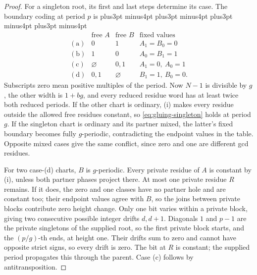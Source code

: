\documentclass[11pt,a4paper]{amsart}
\numberwithin{equation}{section}
\theoremstyle{plain}
\theoremstyle{definition}
\begin{document}
\begin{proof}
For a singleton root, its first and last steps determine its case.  The boundary coding at period \(p\) is
{\abovedisplayskip=14pt plus3pt minus4pt \belowdisplayskip=14pt plus3pt minus4pt
 \abovedisplayshortskip=14pt plus3pt minus4pt \belowdisplayshortskip=14pt plus3pt minus4pt
\begin{equation}\label{eq:gluing-singleton}
 \begin{array}{c|cc|c}
 &\text{free }A&\text{free }B&\text{fixed values}\\ \hline
 \mathrm{(a)}&0&1&A_1=B_0=0\\
 \mathrm{(b)}&1&0&A_0=B_1=1\\
 \mathrm{(c)}&\varnothing&0,1&A_1=0,\ A_0=1\\
 \mathrm{(d)}&0,1&\varnothing&B_1=1,\ B_0=0.
 \end{array}
\end{equation}}
Subscripts zero mean positive multiples of the period.  Now \(N-1\) is divisible by \(g\), the other width is \(1+bg\), and every reduced residue word has at least twice both reduced periods.  If the other chart is ordinary, (i) makes every residue outside the allowed free residues constant, so \eqref{eq:gluing-singleton} holds at period \(g\).  If the singleton chart is ordinary and its partner mixed, the latter's fixed boundary becomes fully \(g\)-periodic, contradicting the endpoint values in the table.  Opposite mixed cases give the same conflict, since zero and one are different gcd residues.

For two case-(d) charts, \(B\) is \(g\)-periodic.  Every private residue of \(A\) is constant by (i), unless both partner phases project there.  At most one private residue \(R\) remains.  If it does, the zero and one classes have no partner hole and are constant too; their endpoint values agree with \(B\), so the joins between private blocks contribute zero height change.  Only one bit varies within a private block, giving two consecutive possible integer drifts \(d,d+1\).  Diagonals \(1\) and \(p-1\) are the private singletons of the supplied root, so the first private block starts, and the \((p/g)\)-th ends, at height one.  Their drifts sum to zero and cannot have opposite strict signs, so every drift is zero.  The bit at \(R\) is constant; the supplied period propagates this through the parent.  Case (c) follows by antitransposition.


\end{proof}
\end{document}
